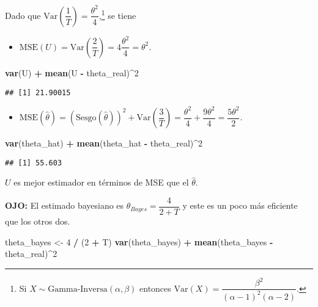 \documentclass[
  12pt,
]{book}
\newenvironment{Shaded}{\begin{snugshade}}{\end{snugshade}}
\newcommand{\DecValTok}[1]{\textcolor[rgb]{0.00,0.00,0.81}{#1}}
\newcommand{\KeywordTok}[1]{\textcolor[rgb]{0.13,0.29,0.53}{\textbf{#1}}}
\newcommand{\NormalTok}[1]{#1}
\newcommand{\OperatorTok}[1]{\textcolor[rgb]{0.81,0.36,0.00}{\textbf{#1}}}
\newcommand{\StringTok}[1]{\textcolor[rgb]{0.31,0.60,0.02}{#1}}
\providecommand{\tightlist}{%
  \setlength{\itemsep}{0pt}\setlength{\parskip}{0pt}}
\begin{document}
Dado que \(\text{Var}\left(\dfrac 1T\right) = \dfrac{\theta^2}4\),\footnote{Si \(X\sim\text{Gamma-Inversa}(\alpha, \beta)\) entonces \(\text{Var}(X)=\dfrac{\beta ^{2}}{(\alpha -1)^2(\alpha-2)}\).} se tiene

\begin{itemize}
\tightlist
\item
  \(\mathrm{MSE}(U) = \text{Var}\left(\dfrac 2T\right) = 4\dfrac{\theta^2}4 = \theta^2\).
\end{itemize}

\begin{Shaded}
\begin{Highlighting}[]
\KeywordTok{var}\NormalTok{(U) }\OperatorTok{+}\StringTok{ }\KeywordTok{mean}\NormalTok{(U }\OperatorTok{{-}}\StringTok{ }\NormalTok{theta\_real)}\OperatorTok{\^{}}\DecValTok{2}
\end{Highlighting}
\end{Shaded}

\begin{verbatim}
## [1] 21.90015
\end{verbatim}

\begin{itemize}
\tightlist
\item
  \(\mathrm{MSE}(\hat\theta) = (\text{Sesgo}(\hat\theta))^2+\text{Var}\left(\dfrac 3T\right) = \dfrac{\theta^2}{4}+\dfrac{9\theta^2}{4} = \dfrac{5\theta^2}{2}\).
\end{itemize}

\begin{Shaded}
\begin{Highlighting}[]
\KeywordTok{var}\NormalTok{(theta\_hat) }\OperatorTok{+}\StringTok{ }\KeywordTok{mean}\NormalTok{(theta\_hat }\OperatorTok{{-}}\StringTok{ }\NormalTok{theta\_real)}\OperatorTok{\^{}}\DecValTok{2}
\end{Highlighting}
\end{Shaded}

\begin{verbatim}
## [1] 55.603
\end{verbatim}

\(U\) es mejor estimador en términos de MSE que el \(\hat\theta\).

\textbf{OJO:} El estimado bayesiano es \(\theta_{Bayes} = \dfrac{4}{2+T}\) y este es
un poco más eficiente que los otros dos.

\begin{Shaded}
\begin{Highlighting}[]
\NormalTok{theta\_bayes \textless{}{-}}\StringTok{ }\DecValTok{4} \OperatorTok{/}\StringTok{ }\NormalTok{(}\DecValTok{2} \OperatorTok{+}\StringTok{ }\NormalTok{T)}
\KeywordTok{var}\NormalTok{(theta\_bayes) }\OperatorTok{+}\StringTok{ }\KeywordTok{mean}\NormalTok{(theta\_bayes }\OperatorTok{{-}}\StringTok{ }\NormalTok{theta\_real)}\OperatorTok{\^{}}\DecValTok{2}
\end{Highlighting}
\end{Shaded}
\end{document}
